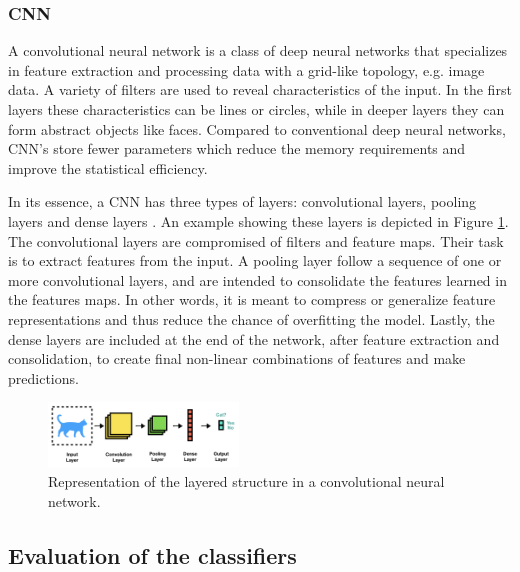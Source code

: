 \subsubsection{CNN}
A convolutional neural network is a class of deep neural networks that specializes in feature extraction and processing data with a grid-like topology, e.g. image data. A variety of filters are used to reveal characteristics of the input. In the first layers these characteristics can be lines or circles, while in deeper layers they can form abstract objects like faces. Compared to conventional deep neural networks, CNN's store fewer parameters which reduce the memory requirements and improve the statistical efficiency. 

In its essence, a CNN has three types of layers: convolutional layers, pooling layers and dense layers \cite{Brownlee2019a}. An example showing these layers is depicted in Figure \ref{fig:cnn}. The convolutional layers are compromised of filters and feature maps. Their task is to extract features from the input. A pooling layer follow a sequence of one or more convolutional layers, and are intended to consolidate the features learned in the features maps. In other words, it is meant to compress or generalize feature representations and thus reduce the chance of overfitting the model. Lastly, the dense layers are included at the end of the network, after feature extraction and consolidation, to create final non-linear combinations of features and make predictions. 

\begin{figure}[H]
    \centering
    \includegraphics[width=0.45\textwidth]{pictures/cnn.png}
    \caption{Representation of the layered structure in a convolutional neural network.}
    \label{fig:cnn}
\end{figure}

\subsection{Evaluation of the classifiers}


